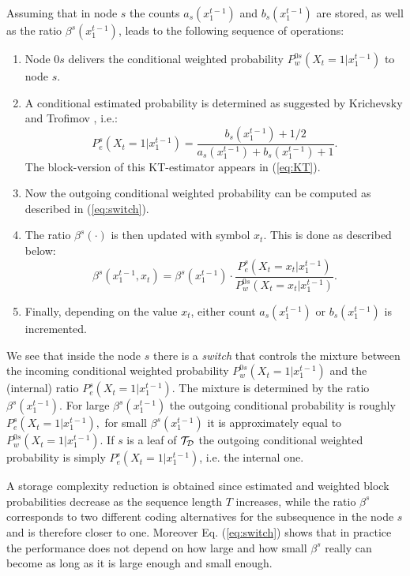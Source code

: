 \documentclass[10pt,conference]{IEEEtran}
\newcommand{\xtm}{x^{t-1}_{1}}
\newcommand{\cTD}{{\cal{T}_{D}}}
\begin{document}
Assuming that in node $s$ the counts $a_{s}(\xtm)$ and $b_{s}(\xtm)$ are stored, as well as the ratio $\beta^{s}(\xtm)$, leads to the following sequence of operations:
\begin{enumerate}
\item
Node $0s$ delivers the conditional weighted probability $P_{w}^{0s}(X_{t}=1|\xtm)$ to node $s$.
\item
A conditional estimated probability is determined as suggested by Krichevsky and Trofimov \cite{KriTro81}, i.e.:
\begin{equation}
\label{Pefromcnts}
P_{e}^{s}(X_{t}=1|\xtm) = \frac{b_{s}(\xtm)+1/2}{a_{s}(\xtm)+b_{s}(\xtm)+1}.
\end{equation}
The block-version of this KT-estimator appears in (\ref{eq:KT}).
\item
Now the outgoing conditional weighted probability can be computed as described in (\ref{eq:switch}).
\item
The ratio $\beta^{s}(\cdot)$ is then updated with symbol $x_{t}$.
This is done as described below:
\begin{equation}\label{updbeta}
\beta^{s}(\xtm,x_{t}) = \beta^{s}(\xtm) \cdot \frac{ P_{e}^{s} (X_{t}=x_{t}|\xtm) }{ P_{w}^{0s}(X_{t}=x_{t}|\xtm) }.
\end{equation}
\item
Finally, depending on the value $x_t$, either count $a_{s}(\xtm)$ or $b_{s}(\xtm)$ is incremented.
\end{enumerate}

We see that inside the node $s$ there is a {\em switch} that controls the mixture between the incoming conditional weighted probability $P_{w}^{0s}(X_{t}=1|\xtm)$ and the (internal) ratio $P_{e}^{s}(X_{t}=1|\xtm)$.
The mixture is determined by the ratio $\beta^{s}(\xtm)$.
For large $\beta^{s}(\xtm)$ the outgoing conditional probability is roughly $P_{e}^{s}(X_{t}=1|\xtm),$ for small $\beta^{s}(\xtm)$ it is approximately equal to $P_{w}^{0s}(X_{t}=1|\xtm)$.
If $s$ is a leaf of $\cTD$ the outgoing conditional weighted probability is simply $P_{e}^{s}(X_{t}=1|\xtm)$, i.e. the internal one.

A storage complexity reduction is obtained since estimated and weighted block probabilities decrease as the sequence length $T$ increases, while the ratio $\beta^{s}$ corresponds to two different coding alternatives for the subsequence in the node $s$ and is therefore closer to one.
Moreover Eq. (\ref{eq:switch}) shows that in practice the performance does not depend on how large and how small $\beta^{s}$ really can become as long as it is large enough and small enough.
\end{document}
